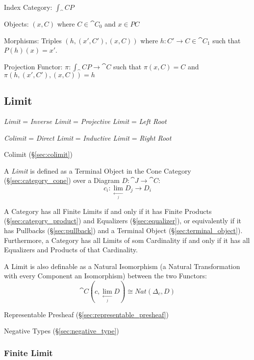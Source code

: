 Index Category: $\int_\cat{C} P$

Objects: $(x,C)$ where $C \in \cat{C}_0$ and $x \in PC$

Morphisms: Triples $(h, (x',C'), (x,C))$ where $h : C' \rightarrow C
\in \cat{C}_1$ such that $P(h)(x) = x'$.

Projection Functor: $\pi : \int_\cat{C} P \rightarrow \cat{C}$
such that $\pi(x,C) = C$ and $\pi(h, (x',C'), (x,C)) = h$



\subsection{Limit}\label{sec:limit}

\emph{Limit} = \emph{Inverse Limit} = \emph{Projective Limit} =
\emph{Left Root}

\emph{Colimit} = \emph{Direct Limit} = \emph{Inductive Limit} =
\emph{Right Root}

Colimit (\S\ref{sec:colimit})

A \emph{Limit} is defined as a Terminal Object in the Cone Category
(\S\ref{sec:category_cone}) over a Diagram $D : \cat{J} \rightarrow
\cat{C}$:
\[
  c_i : \lim_{\xleftarrow[j]{}} D_j \rightarrow D_i
\]

A Category has all Finite Limits if and only if it has Finite Products
(\S\ref{sec:category_product}) and Equalizers (\S\ref{sec:equalizer}),
or equivalently if it has Pullbacks (\S\ref{sec:pullback}) and a
Terminal Object (\S\ref{sec:terminal_object}). Furthermore, a Category
has all Limits of som Cardinality if and only if it has all Equalizers
and Products of that Cardinality. \cite{awodey06}

A Limit is also definable as a Natural Isomorphism (a Natural
Transformation with every Component an Isomorphism) between the two
Functors:
\[
  \cat{C}(c, \lim_{\xleftarrow[j]{}} D) \cong Nat (\Delta_c, D)
\]

Representable Presheaf (\S\ref{sec:representable_presheaf})

Negative Types (\S\ref{sec:negative_type})



\subsubsection{Finite Limit}\label{sec:finite_limit}

